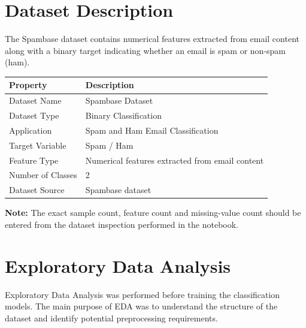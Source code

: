 \documentclass[12pt,a4paper]{article}
\begin{document}

\section{Dataset Description}

The Spambase dataset contains numerical features extracted from email
content along with a binary target indicating whether an email is spam
or non-spam (ham).

\begin{longtable}{|p{5cm}|p{9cm}|}
\hline
\textbf{Property} & \textbf{Description} \\ \hline

Dataset Name &
Spambase Dataset \\ \hline

Dataset Type &
Binary Classification \\ \hline

Application &
Spam and Ham Email Classification \\ \hline

Target Variable &
Spam / Ham \\ \hline

Feature Type &
Numerical features extracted from email content \\ \hline

Number of Classes &
2 \\ \hline

Dataset Source &
Spambase dataset \\ \hline

\end{longtable}

\textbf{Note:} The exact sample count, feature count and missing-value
count should be entered from the dataset inspection performed in the
notebook.


\section{Exploratory Data Analysis}

Exploratory Data Analysis was performed before training the
classification models. The main purpose of EDA was to understand the
structure of the dataset and identify potential preprocessing
requirements.
\end{document}
